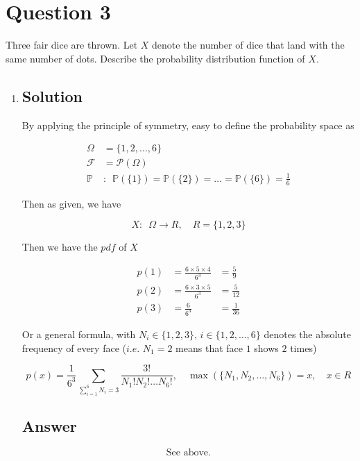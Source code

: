 \documentclass[12pt]{article}
\newcommand{\bP}{\mathbb{P}}
\begin{document}
	
	\section*{Question 3}
	
	\noindent Three fair dice are thrown. Let $X$ denote the number of dice that land with the same number of dots. Describe the probability distribution function of $X$.
	
	\bigskip
	
	\begin{enumerate}[label={},leftmargin=0in]\item
		\subsection*{Solution}
		
			By applying the principle of symmetry, easy to define the probability space as
			
			\[
			\begin{aligned}
				\Omega &= \{1,2,\dots,6\}\\
				\mathcal{F} &= \mathcal{P}(\Omega)\\
				\bP &:\enspace \bP(\{1\}) = \bP(\{2\}) = \dots = \bP(\{6\}) = \frac{1}{6}
			\end{aligned}
			\]
			
			Then as given, we have
			
			\[X:\enspace \Omega \rightarrow R,\quad R = \{1,2,3\}\]
			
			Then we have the $pdf$ of $X$
			
			\[
			\begin{aligned}
				p(1) &= \frac{6\times 5\times 4}{6^3} &= \frac{5}{9}\\
				p(2) &= \frac{6\times 3\times 5}{6^3} &= \frac{5}{12}\\
				p(3) &= \frac{6}{6^3} &= \frac{1}{36}
			\end{aligned}
			\]
			
			Or a general formula, with $N_i \in \{1,2,3\},\, i\in \{1,2,\dots,6\}$ denotes the absolute frequency of every face ($i.e.$ $N_1 = 2$ means that face $1$ shows $2$ times)
			
			\[
				p(x) = \frac{1}{6^3}\sum_{\sum_{i=1}^6N_i=3}\frac{3!}{N_1!N_2!\dots N_6!},\quad \max(\{N_1,N_2,\dots,N_6\}) = x,\quad x\in R
			\]
		
		\subsection*{Answer}
		
			\[\boxed{\text{See above.}}\]
	\end{enumerate}
	
\end{document}
